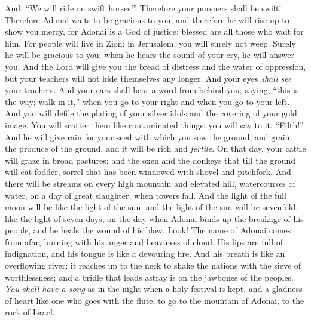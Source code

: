 \begin{biblechapter}
And, “We will ride on swift horses!” Therefore your pursuers shall be swift!
 Therefore Adonai waits to be gracious to you, 
and therefore he will rise up to show you mercy, 
for Adonai is a God of justice; 
blessed are all those who wait for him.
\verse For people will live in Zion; 
in Jerusalem, you will surely not weep. 
Surely he will be gracious to you; 
when he hears the sound of your cry, he will answer you.
\verse And the Lord will give you the bread of distress 
and the water of oppression, 
but your teachers will not hide themselves any longer. 
And your eyes \textit{shall see} your teachers.
\verse And your ears shall hear a word from behind you, saying, 
“this is the way; walk in it,” 
when you go to your right 
and when you go to your left.
\verse And you will defile the plating of your silver idols 
and the covering of your gold image. 
You will scatter them like contaminated things; 
you will say to it, “Filth!”
\verse And he will give rain for your seed with which you sow the ground, 
and grain, the produce of the ground, and it will be rich and \textit{fertile}. 
On that day, your cattle will graze in broad pastures;
\verse and the oxen and the donkeys that till the ground will eat fodder, sorrel 
that has been winnowed with shovel and pitchfork.
\verse And there will be streams on every high mountain and elevated hill, 
watercourses of water, on a day of great slaughter, when towers fall.
\verse And the light of the full moon will be like the light of the sun, 
and the light of the sun will be sevenfold, like the light of seven days, 
on the day when Adonai binds up the breakage of his people, 
and he heals the wound of his blow.
 Look! The name of Adonai comes from afar, 
burning with his anger and heaviness of cloud. 
His lips are full of indignation, 
and his tongue is like a devouring fire.
\verse And his breath is like an overflowing river; 
it reaches up to the neck 
to shake the nations with the sieve of worthlessness; 
and a bridle that leads astray is on the jawbones of the peoples.
\verse \textit{You shall have a song} as in the night when a holy festival is kept, 
and a gladness of heart like one who goes with the flute, 
to go to the mountain of Adonai, to the rock of Israel.

\end{biblechapter}
